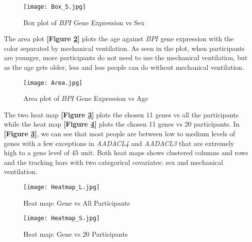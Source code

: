 \documentclass{article}
\begin{document}
\newpage
\begin{figure}[h]
    \centering
    \texttt{[image: Box\_S.jpg]}
    \caption{Box plot of $BPI$ Gene Expression vs Sex}
    \label{fig:BoxS}
\end{figure}

\newpage

The area plot {\textbf{[Figure \ref{fig:Area}]}} plots the age against $BPI$ gene expression with the color separated by mechanical ventilation. As seen in the plot, when participants are younger, more participants do not need to use the mechanical ventilation, but as the age gets older, less and less people can do without mechanical ventilation.
\begin{figure}[h]
    \centering
    \texttt{[image: Area.jpg]}
    \caption{Area plot of $BPI$ Gene Expression vs Age}
    \label{fig:Area}
\end{figure}

\newpage
The two heat map {\textbf{[Figure \ref{fig:Heat_L}]}} plots the chosen 11 genes vs all the participants while the heat map {\textbf{[Figure \ref{fig:Heat_S}]}} plots the chosen 11 genes vs 20 participants. In {\textbf{[Figure \ref{fig:Heat_L}]}}, we can see that most people are between low to medium levels of genes with a few exceptions in {\textit{AADACL4}} and {\textit{AADACL3}} that are extremely high to a gene level of 45 unit. Both heat maps shows clustered columns and rows and the tracking bars with two categorical covariates: sex and mechanical ventilation.
\begin{figure}[h]
    \centering
    \texttt{[image: Heatmap\_L.jpg]}
    \caption{Heat map: Gene vs All Participants}
    \label{fig:Heat_L}
\end{figure}

\newpage
\begin{figure}[h]
    \centering
    \texttt{[image: Heatmap\_S.jpg]}
    \caption{Heat map: Gene vs 20 Participants}
    \label{fig:Heat_S}
\end{figure}
\end{document}
